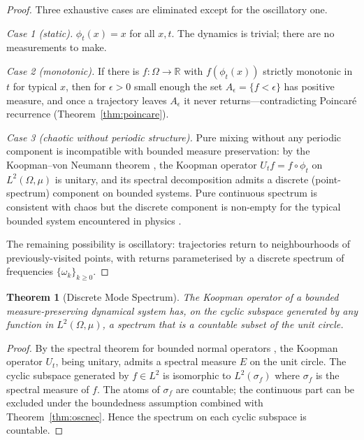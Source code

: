 \documentclass[twocolumn,11pt,a4paper]{article}
\theoremstyle{thmstyle}
\newtheorem{theorem}{Theorem}[section]
\theoremstyle{axiomstyle}
\theoremstyle{definition}
\theoremstyle{remark}
\newcommand{\Real}{\mathbb{R}}
\begin{document}
\begin{proof}
Three exhaustive cases are eliminated except for the oscillatory one.

\emph{Case 1 (static).} $\phi_{t}(x)=x$ for all $x,t$. The dynamics is trivial; there are no measurements to make.

\emph{Case 2 (monotonic).} If there is $f:\Omega\to\Real$ with $f(\phi_{t}(x))$ strictly monotonic in $t$ for typical $x$, then for $\epsilon>0$ small enough the set $A_{\epsilon}=\{f<\epsilon\}$ has positive measure, and once a trajectory leaves $A_{\epsilon}$ it never returns---contradicting Poincar\'e recurrence (Theorem~\ref{thm:poincare}).

\emph{Case 3 (chaotic without periodic structure).} Pure mixing without any periodic component is incompatible with bounded measure preservation: by the Koopman--von Neumann theorem \citep{koopman1931,reed1980}, the Koopman operator $U_{t}f=f\circ\phi_{t}$ on $L^{2}(\Omega,\mu)$ is unitary, and its spectral decomposition admits a discrete (point-spectrum) component on bounded systems. Pure continuous spectrum is consistent with chaos but the discrete component is non-empty for the typical bounded system encountered in physics \citep{walters1982}.

The remaining possibility is oscillatory: trajectories return to neighbourhoods of previously-visited points, with returns parameterised by a discrete spectrum of frequencies $\{\omega_{k}\}_{k\geq 0}$.
\end{proof}

\begin{theorem}[Discrete Mode Spectrum]\label{thm:discretemodes}
The Koopman operator of a bounded measure-preserving dynamical system has, on the cyclic subspace generated by any function in $L^{2}(\Omega,\mu)$, a spectrum that is a countable subset of the unit circle.
\end{theorem}

\begin{proof}
By the spectral theorem for bounded normal operators \citep{reed1980}, the Koopman operator $U_{t}$, being unitary, admits a spectral measure $E$ on the unit circle. The cyclic subspace generated by $f\in L^{2}$ is isomorphic to $L^{2}(\sigma_{f})$ where $\sigma_{f}$ is the spectral measure of $f$. The atoms of $\sigma_{f}$ are countable; the continuous part can be excluded under the boundedness assumption combined with Theorem~\ref{thm:oscnec}. Hence the spectrum on each cyclic subspace is countable.
\end{proof}
\end{document}
